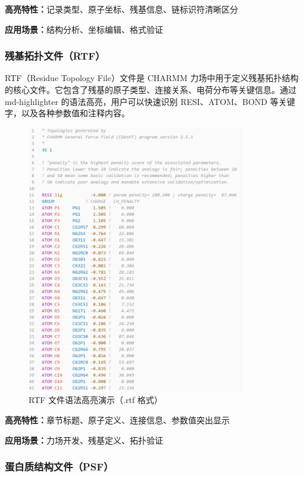 \textbf{高亮特性：}记录类型、原子坐标、残基信息、链标识符清晰区分

\textbf{应用场景：}结构分析、坐标编辑、格式验证

\subsubsection{残基拓扑文件（RTF）}

RTF（Residue Topology File）文件是 CHARMM 力场中用于定义残基拓扑结构的核心文件。它包含了残基的原子类型、连接关系、电荷分布等关键信息。通过 md-highlighter 的语法高亮，用户可以快速识别 RESI、ATOM、BOND 等关键字，以及各种参数值和注释内容。

\begin{figure}[!h]
    \centering
    \includegraphics[width=0.85\textwidth]{../images/rtf.png}
    \caption{RTF 文件语法高亮演示（.rtf 格式）}
    \label{fig:rtf-highlighting}
\end{figure}

\textbf{高亮特性：}章节标题、原子定义、连接信息、参数值突出显示

\textbf{应用场景：}力场开发、残基定义、拓扑验证

\subsubsection{蛋白质结构文件（PSF）}

